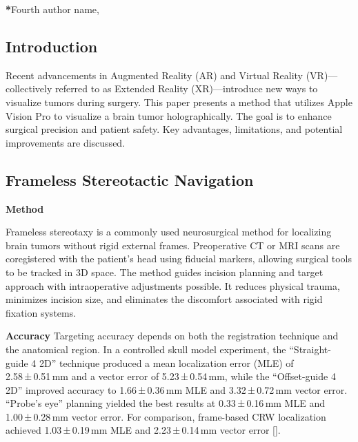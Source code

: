 \documentclass[12pt]{spieman}  %
\begin{document}

{\noindent \footnotesize\textbf{*}Fourth author name,   }

\begin{spacing}{2}   %

\section{Introduction}
\label{sect:intro}  %
Recent advancements in Augmented Reality (AR) and Virtual Reality (VR)—collectively referred to as Extended Reality (XR)—introduce new ways to visualize tumors during surgery. This paper presents a method that utilizes Apple Vision Pro to visualize a brain tumor holographically. The goal is to enhance surgical precision and patient safety. Key advantages, limitations, and potential improvements are discussed. 

\subsection{Frameless Stereotactic Navigation }

\textbf{Method}

 Frameless stereotaxy is a commonly used neurosurgical method for localizing brain tumors without rigid external frames. Preoperative CT or MRI scans are coregistered with the patient’s head using fiducial markers, allowing surgical tools to be tracked in 3D space. The method guides incision planning and target approach with intraoperative adjustments possible. It reduces physical trauma, minimizes incision size, and eliminates the discomfort associated with rigid fixation systems.

\textbf{Accuracy}
Targeting accuracy depends on both the registration technique and the anatomical region. In a controlled skull model experiment, the “Straight-guide 4 2D” technique produced a mean localization error (MLE) of 2.58 ± 0.51 mm and a vector error of 5.23 ± 0.54 mm, while the “Offset-guide 4 2D” improved accuracy to 1.66 ± 0.36 mm MLE and 3.32 ± 0.72 mm vector error. “Probe’s eye” planning yielded the best results at 0.33 ± 0.16 mm MLE and 1.00 ± 0.28 mm vector error. For comparison, frame-based CRW localization achieved 1.03 ± 0.19 mm MLE and 2.23 ± 0.14 mm vector error [\cite{Fitzpatrick01}].


\end{spacing}
\end{document}

